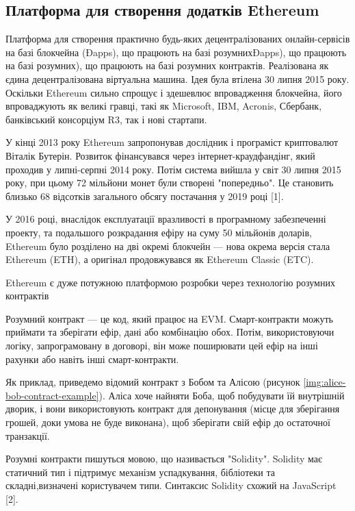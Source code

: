 \documentclass{lib/styles/default-style}
\begin{document}
\subsection{Платформа для створення додатків Ethereum}

    Платформа для створення практично будь-яких децентралізованих
    онлайн-сервісів на базі блокчейна (Đapps), що працюють на базі розумнихĐapps), що працюють на базі розумних), що працюють на базі розумних
    контрактів. Реалізована як єдина децентралізована віртуальна машина. Ідея була
    втілена 30 липня 2015 року. Оскільки Ethereum сильно спрощує і здешевлює
    впровадження блокчейна, його впроваджують як великі гравці, такі як Microsoft, IBM, Acronis,
    Сбербанк, банківський консорціум R3, так і нові стартапи.

    У кінці 2013 року Ethereum запропонував дослідник
    і програміст криптовалют Віталік Бутерін. Розвиток фінансувався через інтернет-краудфандінг, який проходив
    у липні-серпні 2014 року. Потім система вийшла у світ 30 липня 2015 року, при цьому 72 мільйони монет були
    створені "попередньо". Це становить близько 68 відсотків загального обсягу постачання у 2019 році [1]. 

    У 2016 році,
    внаслідок експлуатації вразливості в програмному забезпеченні проекту, та подальшого розкрадання ефіру на суму 
    50 мільйонів доларів, Ethereum було розділено на дві окремі блокчейн --- нова окрема версія стала Ethereum (ETH), а оригінал продовжувався 
    як Ethereum Classic (ETC).

    Ethereum є дуже потужною платформою розробки через технологію розумних контрактів

    Розумний контракт --- це код, який працює на EVM.
    Смарт-контракти можуть приймати та зберігати ефір, дані або комбінацію обох.
    Потім, використовуючи логіку, запрограмовану в договорі, він може поширювати
    цей ефір на інші рахунки або навіть інші смарт-контракти.

    Як приклад, приведемо відомий контракт з Бобом та Алісою (рисунок \ref{img:alice-bob-contract-example}). Аліса хоче найняти Боба, щоб побудувати їй внутрішній дворик,
    і вони використовують контракт для депонування (місце для зберігання грошей, доки умова не буде виконана),
    щоб зберігати свій ефір до остаточної транзакції.


    Розумні контракти пишуться мовою, що називається "Solidity". Solidity має статичний тип і підтримує механізм успадкування,
    бібліотеки та складні,визначені користувачем типи. Синтаксис Solidity схожий на JavaScript [2].
\end{document}
